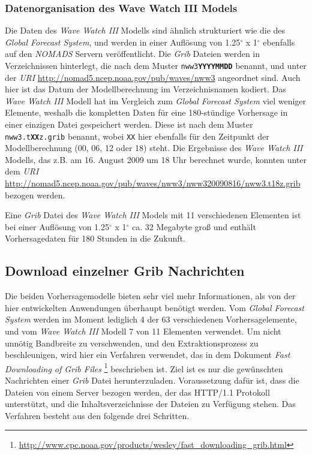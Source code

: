 \subsubsection{Datenorganisation des Wave Watch III Models}
Die Daten des \textit{Wave Watch III} Modells sind ähnlich
strukturiert wie die des \textit{Global Forecast System}, und werden
in einer Auflösung von 1.25$^{\circ}$ x 1$^{\circ}$ ebenfalls auf den
\textit{NOMADS} Servern veröffentlicht. Die \textit{Grib} Dateien
werden in Verzeichnissen hinterlegt, die nach dem Muster
\texttt{nww3\textbf{YYYYMMDD}} benannt, und unter der \textit{URI}
\url{http://nomad5.ncep.noaa.gov/pub/waves/nww3} angeordnet sind. Auch
hier ist das Datum der Modellberechnung im Verzeichnisnamen
kodiert. Das \textit{Wave Watch III} Modell hat im Vergleich zum
\textit{Global Forecast System} viel weniger Elemente, weshalb die
kompletten Daten für eine 180-stündige Vorhersage in einer einzigen
Datei gespeichert werden. Diese ist nach dem Muster
\texttt{nww3.t\textbf{XX}z.grib} benannt, wobei \texttt{XX} hier
ebenfalls für den Zeitpunkt der Modellberechnung (00, 06, 12 oder 18)
steht. Die Ergebnisse des \textit{Wave Watch III} Modells, das z.B. am
16. August 2009 um 18 Uhr berechnet wurde, konnten unter dem
\textit{URI}
\url{http://nomad5.ncep.noaa.gov/pub/waves/nww3/nww320090816/nww3.t18z.grib}
bezogen werden.

Eine \textit{Grib} Datei des \textit{Wave Watch III} Models mit 11
verschiedenen Elementen ist bei einer Auflösung von
1.25$^{\circ}$ x 1$^{\circ}$ ca. 32 Megabyte groß und enthält
Vorhersagedaten für 180 Stunden in die Zukunft.

\subsection{Download einzelner Grib Nachrichten}
\label{subsec:download}
Die beiden Vorhersagemodelle bieten sehr viel mehr Informationen, als
von der hier entwickelten Anwendungen überhaupt benötigt werden. Vom
\textit{Global Forecast System} werden im Moment lediglich 4 der 63
verschiedenen Vorhersagelemente, und vom \textit{Wave Watch III}
Modell 7 von 11 Elementen verwendet. Um nicht unnötig Bandbreite zu
verschwenden, und den Extraktionsprozess zu beschleunigen, wird hier
ein Verfahren verwendet, das in dem Dokument \textit{Fast Downloading
  of Grib Files}
\footnote{\url{http://www.cpc.noaa.gov/products/wesley/fast_downloading_grib.html}}
beschrieben ist. Ziel ist es nur die gewünschten Nachrichten einer
\textit{Grib} Datei herunterzuladen. Voraussetzung dafür ist, dass die
Dateien von einem Server bezogen werden, der das HTTP/1.1 Protokoll
unterstützt, und die Inhaltsverzeichnisse der Dateien zu Verfügung
stehen. Das Verfahren besteht aus den folgende drei Schritten.


